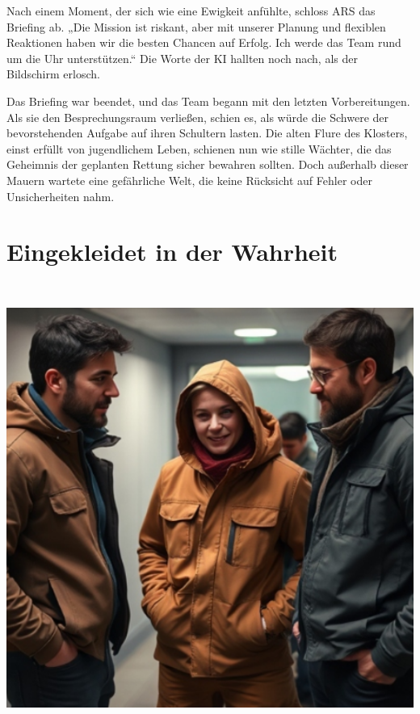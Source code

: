 \documentclass[
]{article}
\begin{document}
Nach einem Moment, der sich wie eine Ewigkeit anfühlte, schloss ARS das
Briefing ab. „Die Mission ist riskant, aber mit unserer Planung und
flexiblen Reaktionen haben wir die besten Chancen auf Erfolg. Ich werde
das Team rund um die Uhr unterstützen.`` Die Worte der KI hallten noch
nach, als der Bildschirm erlosch.

Das Briefing war beendet, und das Team begann mit den letzten
Vorbereitungen. Als sie den Besprechungsraum verließen, schien es, als
würde die Schwere der bevorstehenden Aufgabe auf ihren Schultern lasten.
Die alten Flure des Klosters, einst erfüllt von jugendlichem Leben,
schienen nun wie stille Wächter, die das Geheimnis der geplanten Rettung
sicher bewahren sollten. Doch außerhalb dieser Mauern wartete eine
gefährliche Welt, die keine Rücksicht auf Fehler oder Unsicherheiten
nahm.

\section{Eingekleidet in der
Wahrheit}\label{eingekleidet-in-der-wahrheit}

\includegraphics[width=5.88542in,height=5.79167in]{media/image006.png}
\end{document}
